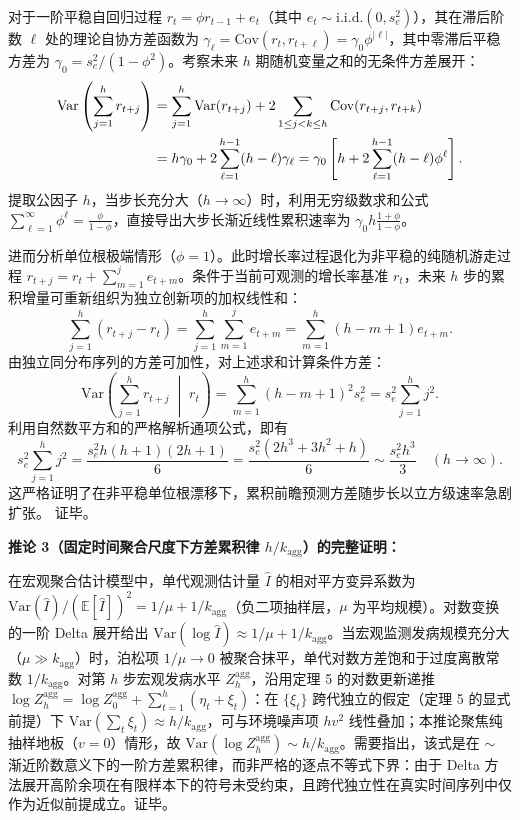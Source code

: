 \documentclass[11pt,a4paper]{article}
\theoremstyle{plain}
\theoremstyle{definition}
\begin{document}
对于一阶平稳自回归过程 $r_t = \phi r_{t-1} + e_t$（其中 $e_t \sim \text{i.i.d.}(0, s_e^2)$），其在滞后阶数 $\ell$ 处的理论自协方差函数为 $\gamma_\ell = \text{Cov}(r_t, r_{t+\ell}) = \gamma_0 \phi^{|\ell|}$，其中零滞后平稳方差为 $\gamma_0 = s_e^2/(1-\phi^2)$。考察未来 $h$ 期随机变量之和的无条件方差展开：
\begin{align}
\text{Var}\left(\sum_{j=1}^h r_{t+j}\right) &= \sum_{j=1}^h \text{Var}(r_{t+j}) + 2 \sum_{1 \le j < k \le h} \text{Cov}(r_{t+j}, r_{t+k}) \notag \\
&= h \gamma_0 + 2 \sum_{\ell=1}^{h-1} (h - \ell) \gamma_\ell = \gamma_0 \left[ h + 2 \sum_{\ell=1}^{h-1} (h-\ell) \phi^\ell \right].
\end{align}
提取公因子 $h$，当步长充分大（$h \to \infty$）时，利用无穷级数求和公式 $\sum_{\ell=1}^\infty \phi^\ell = \frac{\phi}{1-\phi}$，直接导出大步长渐近线性累积速率为 $\gamma_0 h \frac{1+\phi}{1-\phi}$。

进而分析单位根极端情形（$\phi = 1$）。此时增长率过程退化为非平稳的纯随机游走过程 $r_{t+j} = r_t + \sum_{m=1}^j e_{t+m}$。条件于当前可观测的增长率基准 $r_t$，未来 $h$ 步的累积增量可重新组织为独立创新项的加权线性和：
\begin{equation}
\sum_{j=1}^h (r_{t+j} - r_t) = \sum_{j=1}^h \sum_{m=1}^j e_{t+m} = \sum_{m=1}^h (h - m + 1) e_{t+m}.
\end{equation}
由独立同分布序列的方差可加性，对上述求和计算条件方差：
\begin{equation}
\text{Var}\left(\sum_{j=1}^h r_{t+j} \;\middle|\; r_t\right) = \sum_{m=1}^h (h - m + 1)^2 s_e^2 = s_e^2 \sum_{j=1}^h j^2.
\end{equation}
利用自然数平方和的严格解析通项公式，即有
\begin{equation}
s_e^2 \sum_{j=1}^h j^2 = \frac{s_e^2 h(h+1)(2h+1)}{6} = \frac{s_e^2 (2h^3 + 3h^2 + h)}{6} \sim \frac{s_e^2 h^3}{3} \quad (h \to \infty).
\end{equation}
这严格证明了在非平稳单位根漂移下，累积前瞻预测方差随步长以立方级速率急剧扩张。
证毕。

\vspace{0.8em}
\noindent\textbf{推论 3（固定时间聚合尺度下方差累积律 $h/k_{\text{agg}}$）的完整证明：}


在宏观聚合估计模型中，单代观测估计量 $\hat{I}$ 的相对平方变异系数为 $\text{Var}(\hat{I})/(\mathbb{E}[\hat{I}])^2 = 1/\mu + 1/k_{\text{agg}}$（负二项抽样层，$\mu$ 为平均规模）。对数变换的一阶 Delta 展开给出 $\text{Var}(\log\hat{I}) \approx 1/\mu + 1/k_{\text{agg}}$。当宏观监测发病规模充分大（$\mu \gg k_{\text{agg}}$）时，泊松项 $1/\mu \to 0$ 被聚合抹平，单代对数方差饱和于过度离散常数 $1/k_{\text{agg}}$。对第 $h$ 步宏观发病水平 $Z_h^{\text{agg}}$，沿用定理 5 的对数更新递推 $\log Z_h^{\text{agg}} = \log Z_0^{\text{agg}} + \sum_{t=1}^{h}(\eta_t + \xi_t)$：在 $\{\xi_t\}$ 跨代独立的假定（定理 5 的显式前提）下 $\text{Var}(\sum_t \xi_t) \approx h/k_{\text{agg}}$，可与环境噪声项 $hv^2$ 线性叠加；本推论聚焦纯抽样地板（$v=0$）情形，故 $\text{Var}(\log Z_h^{\text{agg}}) \sim h/k_{\text{agg}}$。需要指出，该式是在 $\sim$ 渐近阶数意义下的一阶方差累积律，而非严格的逐点不等式下界：由于 Delta 方法展开高阶余项在有限样本下的符号未受约束，且跨代独立性在真实时间序列中仅作为近似前提成立。证毕。
\end{document}
